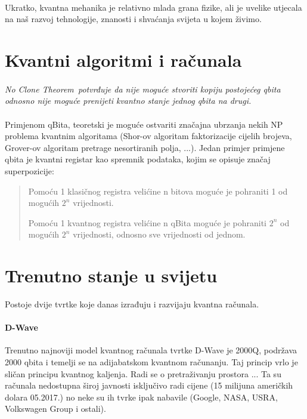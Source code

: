 \documentclass[times, utf8, zavrsni]{fer}
\begin{document}
\paragraph{}
Ukratko, kvantna mehanika je relativno mlada grana fizike, ali je uvelike utjecala na naš razvoj tehnologije, znanosti i shvaćanja svijeta u kojem živimo.

\section{Kvantni algoritmi i računala}

\paragraph{}
\it No Clone Theorem\rm\ potvrđuje da nije moguće stvoriti kopiju postojećeg qbita odnosno nije moguće prenijeti kvantno stanje jednog qbita na drugi.

\paragraph{}
Primjenom qBita, teoretski je moguće ostvariti značajna ubrzanja nekih NP problema kvantnim algoritama (Shor-ov algoritam faktorizacije cijelih brojeva, Grover-ov algoritam pretrage nesortiranih polja, ...).
Jedan primjer primjene qbita je kvantni registar kao spremnik podataka, kojim se opisuje značaj superpozicije:
\begin{quote}
Pomoću 1 klasičnog registra velićine n bitova moguće je pohraniti 1 od mogućih $2^n$ vrijednosti.

Pomoću 1 kvantnog registra velićine n qBita moguće je pohraniti $2^n$ od mogućih $2^n$ vrijednosti, odnosno sve vrijednosti od jednom.
\end{quote}

\section{Trenutno stanje u svijetu}
Postoje dvije tvrtke koje danas izrađuju i razvijaju kvantna računala.

\paragraph{D-Wave}
Trenutno najnoviji model kvantnog računala tvrtke D-Wave je 2000Q, podržava 2000 qbita i temelji se na adijabatskom kvantnom računanju. Taj princip vrlo je sličan principu kvantnog kaljenja. Radi se o pretraživanju prostora ...
Ta su računala nedostupna široj javnosti isključivo radi cijene (15 milijuna američkih dolara 05.2017.) no neke su ih tvrke ipak nabavile (Google, NASA, USRA, Volkswagen Group i ostali).
\end{document}
